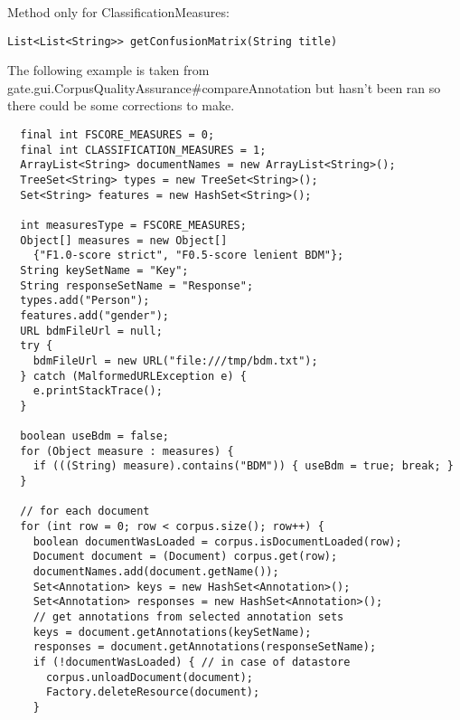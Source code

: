Method only for ClassificationMeasures:
\begin{small}\begin{verbatim}
List<List<String>> getConfusionMatrix(String title)
\end{verbatim}\end{small}

The following example is taken from
{gate.gui.CorpusQualityAssurance\#compareAnnotation} but hasn't been ran so
there could be some corrections to make.

\begin{lstlisting}
  final int FSCORE_MEASURES = 0;
  final int CLASSIFICATION_MEASURES = 1;
  ArrayList<String> documentNames = new ArrayList<String>();
  TreeSet<String> types = new TreeSet<String>();
  Set<String> features = new HashSet<String>();

  int measuresType = FSCORE_MEASURES;
  Object[] measures = new Object[]
    {"F1.0-score strict", "F0.5-score lenient BDM"};
  String keySetName = "Key";
  String responseSetName = "Response";
  types.add("Person");
  features.add("gender");
  URL bdmFileUrl = null;
  try {
    bdmFileUrl = new URL("file:///tmp/bdm.txt");
  } catch (MalformedURLException e) {
    e.printStackTrace();
  }

  boolean useBdm = false;
  for (Object measure : measures) {
    if (((String) measure).contains("BDM")) { useBdm = true; break; }
  }

  // for each document
  for (int row = 0; row < corpus.size(); row++) {
    boolean documentWasLoaded = corpus.isDocumentLoaded(row);
    Document document = (Document) corpus.get(row);
    documentNames.add(document.getName());
    Set<Annotation> keys = new HashSet<Annotation>();
    Set<Annotation> responses = new HashSet<Annotation>();
    // get annotations from selected annotation sets
    keys = document.getAnnotations(keySetName);
    responses = document.getAnnotations(responseSetName);
    if (!documentWasLoaded) { // in case of datastore
      corpus.unloadDocument(document);
      Factory.deleteResource(document);
    }


\end{lstlisting}
